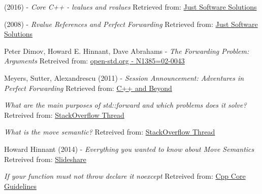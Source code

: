      (2016) - \emph{Core C++ - lvalues and rvalues}
    \newline
    Retrieved from: \href{https://www.justsoftwaresolutions.co.uk/cplusplus/core-c++-lvalues-and-rvalues.html}{Just Software Solutions}

     (2008) - \emph{Rvalue References and Perfect Forwarding}
    \newline
    Retrieved from: \href{https://www.justsoftwaresolutions.co.uk/cplusplus/rvalue_references_and_perfect_forwarding.html}{Just Software Solutions}
    
     Peter Dimov, Howard E. Hinnant, Dave Abrahams - \emph{The Forwarding Problem: Arguments}
    \newline
    Retreived from: \href{https://www.open-std.org/jtc1/sc22/wg21/docs/papers/2002/n1385.htm}{open-std.org - N1385=02-0043}
    
    Meyers, Sutter, Alexandrescu (2011) - \emph{Session Announcement: Adventures in Perfect Forwarding}
    \newline
    Retrieved from: \href{https://cppandbeyond.com/2011/04/25/session-announcement-adventures-in-perfect-forwarding/}{C++ and Beyond}
    
    \emph{What are the main purposes of std::forward and which problems does it solve?}
    \newline
    Retreived from: \href{https://stackoverflow.com/questions/3582001/what-are-the-main-purposes-of-stdforward-and-which-problems-does-it-solve}{StackOverflow Thread}

    \emph{What is the move semantic?}
    \newline
    Retreived from: \href{https://stackoverflow.com/questions/3106110/what-is-move-semantics}{StackOverflow Thread}

     Howard Hinnant (2014) - \emph{Everything you wanted to know about Move Semantics}
    \newline
    Retreived from: \href{https://www.slideshare.net/ripplelabs/howard-hinnant-accu2014}{Slideshare}
    
    \emph{If your function must not throw declare it noexcept}
    \newline
    Retreived from: \href{https://github.com/isocpp/CppCoreGuidelines/blob/master/CppCoreGuidelines.md#f6-if-your-function-must-not-throw-declare-it-noexcept}{Cpp Core Guidelines}

